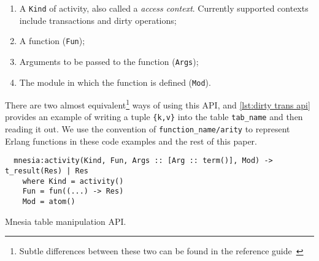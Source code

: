 \begin{enumerate}
  \item A \texttt{Kind} of activity, also called a \emph{access context}.
  Currently supported contexts include transactions and dirty operations;
  \item A function (\texttt{Fun});
  \item Arguments to be passed to the function (\texttt{Args});
  \item The module in which the function is defined (\texttt{Mod}).
\end{enumerate}

There are two almost equivalent\footnote{Subtle differences between these two 
can be found in the reference guide~\cite{ericssonab2023mnesiaref}} ways of 
using this API, and \cref{lst:dirty trans api} provides an example of
writing a tuple \verb|{k,v}| into the table \verb|tab_name| and then reading it out.
We use the convention of \verb|function_name/arity| to represent Erlang functions
in these code examples and the rest of this paper.


\begin{listing}[htp]
  \centering
  \begin{verbatim}
  mnesia:activity(Kind, Fun, Args :: [Arg :: term()], Mod) -> t_result(Res) | Res 
    where Kind = activity()
    Fun = fun((...) -> Res)
    Mod = atom()
  \end{verbatim}
  \caption{Mnesia table manipulation API.}
  \label{lst:mnesia activity}
\end{listing}

